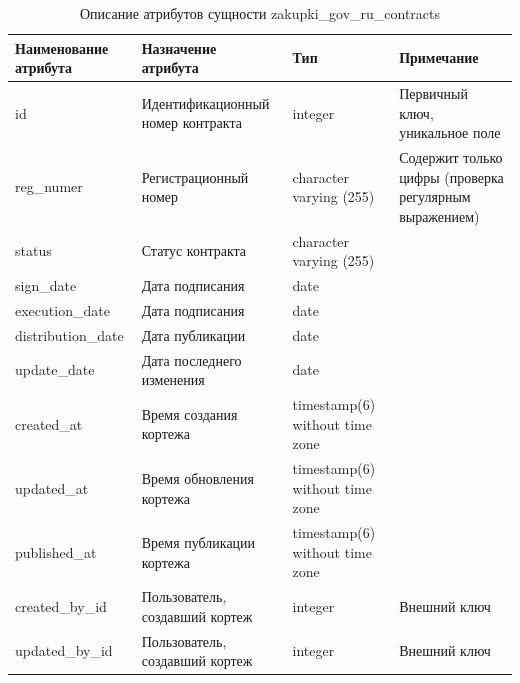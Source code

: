 \documentclass{mirea}
\begin{document}
	\begin{longtable}{ |p{}|p{}|p{}|p{}| } 
		\caption{Описание атрибутов сущности zakupki\_gov\_ru\_contracts}
		\endfirsthead
		\endhead
		\hline
		Наименование атрибута & Назначение атрибута & Тип & Примечание \\ \hline
		
		id & Идентификацион\-ный номер контракта & integer & Первичный ключ, уникальное поле \\ \hline
		
		reg\_numer & Регистрационный номер & character varying (255) & Содержит только цифры (проверка регулярным выражением) \\ \hline
		
		status & Статус контракта & character varying (255) & \\ \hline
		
		sign\_date & Дата подписания  & date & \\ \hline

		execution\_date & Дата подписания  & date & \\ \hline
		
		distribution\_date & Дата публикации  & date & \\ \hline
		
		update\_date & Дата последнего изменения  & date & \\ \hline
				
		created\_at & Время создания кортежа & timestamp(6) without time zone & \\ \hline
		
		updated\_at & Время обновления кортежа & timestamp(6) without time zone & \\ \hline
		
		published\_at & Время публикации кортежа & timestamp(6) without time zone & \\ \hline
		
		created\_by\_id & Пользователь, создавший кортеж & integer & Внешний ключ \\ \hline
		
		updated\_by\_id & Пользователь, создавший кортеж & integer & Внешний ключ \\ \hline
		
	\end{longtable}
	
\end{document}
